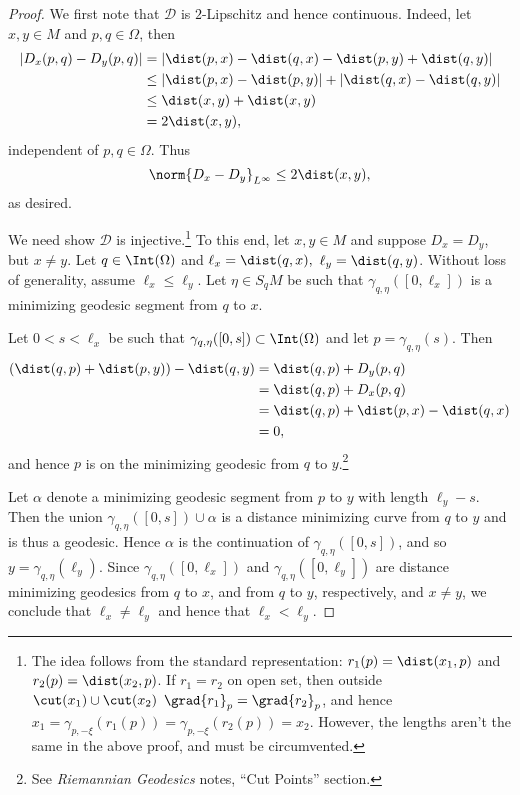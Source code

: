 \begin{proof}
We first note that $\mathcal{D}$ is $2$-Lipschitz and hence continuous.  Indeed, let $x,y\in M$ and $p,q\in\Omega$, then
\begin{align*}
	|D_x(p,q)-D_y(p,q)|&=|\dist(p,x)-\dist(q,x)-\dist(p,y)+\dist(q,y)|\\
	&\leq|\dist(p,x)-\dist(p,y)|+|\dist(q,x)-\dist(q,y)|\\
	&\leq\dist(x,y)+\dist(x,y)\\
	&=2\dist(x,y),
\end{align*}
independent of $p,q\in\Omega$.  Thus
$$\norm{D_x-D_y}_{L^\infty}\leq 2\dist(x,y),$$
as desired.




We need show $\mathcal{D}$ is injective.\footnote{The idea follows from the standard representation: $r_1(p)=\dist(x_1,p)$ and $r_2(p)=\dist(x_2,p)$.  If $r_1=r_2$ on open set, then outside $\cut(x_1)\cup\cut(x_2)$ $\grad{r_1}_p=\grad{r_2}_p$, and hence $x_1=\gamma_{p,-\xi}(r_1(p))=\gamma_{p,-\xi}(r_2(p))=x_2$.  However, the lengths aren't the same in the above proof, and must be circumvented.}  To this end, let $x,y\in M$ and suppose $D_x=D_y$, but $x\neq y$.  Let $q\in\Int(\Omega)$ and $\ell_x=\dist(q,x),$ $\ell_y=\dist(q,y)$.  Without loss of generality, assume $\ell_x\leq\ell_y$. Let $\eta\in S_q M$ be such that $\gamma_{q,\eta}([0,\ell_x])$ is a minimizing geodesic segment from $q$ to $x$.

Let $0<s<\ell_x$ be such that $\gamma_{q,\eta}([0,s])\subset\Int(\Omega)$ and let $p=\gamma_{q,\eta}(s)$.  Then
\begin{align*}
	(\dist(q,p)+\dist(p,y))-\dist(q,y)&=\dist(q,p)+D_y(p,q)\\
	&=\dist(q,p)+D_x(p,q)\\
	&=\dist(q,p)+\dist(p,x)-\dist(q,x)\\
	&=0,
\end{align*}
and hence $p$ is on the minimizing geodesic from $q$ to $y$.\footnote{See \textit{Riemannian Geodesics} notes, ``Cut Points'' section.}

Let $\alpha$ denote a minimizing geodesic segment from $p$ to $y$ with length $\ell_y-s$.  Then the union $\gamma_{q,\eta}([0,s])\cup\alpha$ is a distance minimizing curve from $q$ to $y$ and is thus a geodesic.  Hence $\alpha$ is the continuation of $\gamma_{q,\eta}([0,s])$, and so $y=\gamma_{q,\eta}(\ell_y)$.  Since $\gamma_{q,\eta}([0,\ell_x])$ and $\gamma_{q,\eta}([0,\ell_y])$ are distance minimizing geodesics from $q$ to $x$, and from $q$ to $y$, respectively, and $x\neq y$, we conclude that $\ell_x\neq\ell_y$ and hence that $\ell_x<\ell_y$.


\end{proof}
